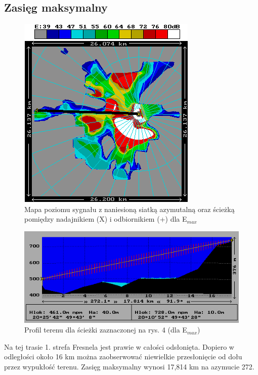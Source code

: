 \documentclass[12pt, a4paper, oneside]{article}
\begin{document}
\subsection{Zasięg maksymalny}
\begin{figure}[h!]
\centering
\includegraphics[scale=1.1]{pics/mapki/f4.png}
\caption{Mapa poziomu sygnału z naniesioną siatką azymutalną oraz ścieżką pomiędzy nadajnikiem (X) i odbiornikiem (+) dla E$_{max}$}
\end{figure}
\clearpage
\begin{figure}[h!]
\centering
\includegraphics[scale=1.1]{pics/mapki/f5.png}
\caption{Profil terenu dla ścieżki zaznaczonej na rys. 4 (dla E$_{max}$)}
\end{figure}
Na tej trasie 1. strefa Fresnela jest prawie w całości odsłonięta. Dopiero w odległości około 16 km można zaobserwować niewielkie przesłonięcie od dołu przez wypukłość terenu. Zasięg maksymalny wynosi 17,814 km na azymucie 272\textdegree.
\end{document}
